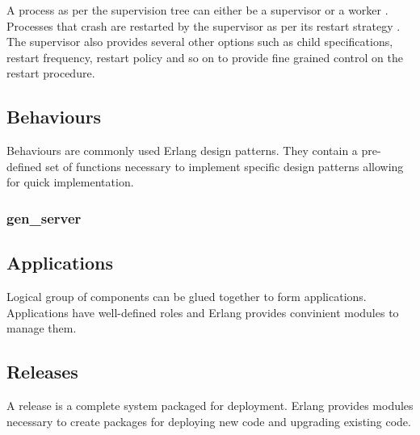 A process as per the supervision tree can either be a supervisor%
or a worker%
. Processes that crash are restarted by the supervisor as per its 
restart strategy%
. The supervisor also provides several other options such as child 
specifications, restart frequency, restart policy and so on to provide
fine grained control on the restart procedure.

\subsection{Behaviours}
\label{section:concepts.behaviours}
Behaviours are commonly used Erlang design patterns. They contain a pre-defined 
set of functions necessary to implement specific design patterns allowing for 
quick implementation.

\subsubsection{gen\_server}


\subsection{Applications}
\label{section:concepts.applications}
Logical group of components can be glued together to form applications. 
Applications have well-defined roles and Erlang provides convinient modules to 
manage them.

\subsection{Releases}
\label{section:concepts.releases}
A release is a complete system packaged for deployment. Erlang provides modules 
necessary to create packages for deploying new code and upgrading existing code.

